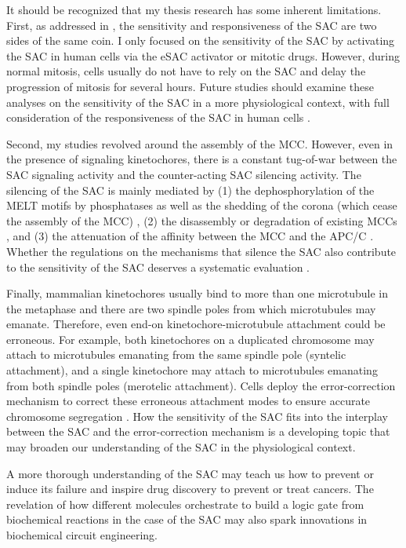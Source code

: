 It should be recognized that my thesis research has some inherent limitations. First, as addressed in , the sensitivity and responsiveness of the SAC are two sides of the same coin. I only focused on the sensitivity of the SAC by activating the SAC in human cells via the eSAC activator or mitotic drugs. However, during normal mitosis, cells usually do not have to rely on the SAC and delay the progression of mitosis for several hours. Future studies should examine these analyses on the sensitivity of the SAC in a more physiological context, with full consideration of the responsiveness of the SAC in human cells \cite{YeastMELTSpecificity}.

Second, my studies revolved around the assembly of the MCC. However, even in the presence of signaling kinetochores, there is a constant tug-of-war between the SAC signaling activity and the counter-acting SAC silencing activity. The silencing of the SAC is mainly mediated by (1) the dephosphorylation of the MELT motifs by phosphatases as well as the shedding of the corona (which cease the assembly of the MCC) \cite{PP2A-B56, DyneinStripsCorona}, (2) the disassembly or degradation of existing MCCs \cite{BubR1MitosisTurnover, CCT-MCCDisassembly, Ubiquitylation-MCCDisassembly, UBR5-MCCDisassembly, TRIP13-p31-MAD2}, and (3) the attenuation of the affinity between the MCC and the APC/C \cite{APC-SUMO}. Whether the regulations on the mechanisms that silence the SAC also contribute to the sensitivity of the SAC deserves a systematic evaluation \cite{0thOrder, ZeroOrder}.

Finally, mammalian kinetochores usually bind to more than one microtubule in the metaphase and there are two spindle poles from which microtubules may emanate. Therefore, even end-on kinetochore-microtubule attachment could be erroneous. For example, both kinetochores on a duplicated chromosome may attach to microtubules emanating from the same spindle pole (syntelic attachment), and a single kinetochore may attach to microtubules emanating from both spindle poles (merotelic attachment). Cells deploy the error-correction mechanism to correct these erroneous attachment modes to ensure accurate chromosome segregation \cite{Syntelic+Merotelic}. How the sensitivity of the SAC fits into the interplay between the SAC and the error-correction mechanism is a developing topic that may broaden our understanding of the SAC in the physiological context.



A more thorough understanding of the SAC may teach us how to prevent or induce its failure and inspire drug discovery to prevent or treat cancers. The revelation of how different molecules orchestrate to build a  logic gate from biochemical reactions in the case of the SAC may also spark innovations in biochemical circuit engineering.